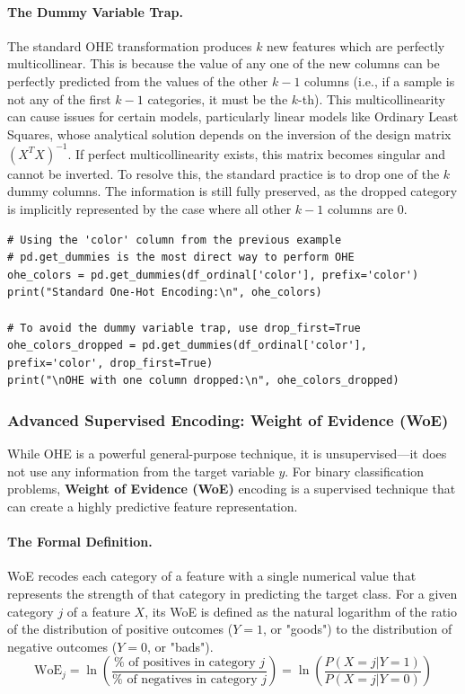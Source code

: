 \begin{itemize}
\paragraph{The Dummy Variable Trap.} The standard OHE transformation produces $k$ new features which are perfectly multicollinear. This is because the value of any one of the new columns can be perfectly predicted from the values of the other $k-1$ columns (i.e., if a sample is not any of the first $k-1$ categories, it must be the $k$-th). This multicollinearity can cause issues for certain models, particularly linear models like Ordinary Least Squares, whose analytical solution depends on the inversion of the design matrix $(X^T X)^{-1}$. If perfect multicollinearity exists, this matrix becomes singular and cannot be inverted. To resolve this, the standard practice is to drop one of the $k$ dummy columns. The information is still fully preserved, as the dropped category is implicitly represented by the case where all other $k-1$ columns are 0.

\begin{verbatim}
# Using the 'color' column from the previous example
# pd.get_dummies is the most direct way to perform OHE
ohe_colors = pd.get_dummies(df_ordinal['color'], prefix='color')
print("Standard One-Hot Encoding:\n", ohe_colors)

# To avoid the dummy variable trap, use drop_first=True
ohe_colors_dropped = pd.get_dummies(df_ordinal['color'], prefix='color', drop_first=True)
print("\nOHE with one column dropped:\n", ohe_colors_dropped)
\end{verbatim}

\subsubsection{Advanced Supervised Encoding: Weight of Evidence (WoE)}
While OHE is a powerful general-purpose technique, it is unsupervised—it does not use any information from the target variable $y$. For binary classification problems, \textbf{Weight of Evidence (WoE)} encoding is a supervised technique that can create a highly predictive feature representation.

\paragraph{The Formal Definition.} WoE recodes each category of a feature with a single numerical value that represents the strength of that category in predicting the target class. For a given category $j$ of a feature $X$, its WoE is defined as the natural logarithm of the ratio of the distribution of positive outcomes ($Y=1$, or "goods") to the distribution of negative outcomes ($Y=0$, or "bads").
$$ \text{WoE}_j = \ln\left(\frac{\%\text{ of positives in category } j}{\%\text{ of negatives in category } j}\right) = \ln\left(\frac{P(X=j | Y=1)}{P(X=j | Y=0)}\right) $$

\end{itemize}
